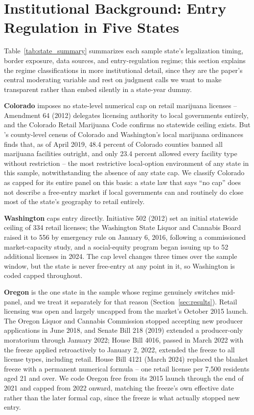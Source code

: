 \documentclass[12pt]{article}
\begin{document}
\section{Institutional Background: Entry Regulation in Five States}
\label{sec:institutional}



Table~\ref{tab:state_summary} summarizes each sample state's legalization timing, border exposure, data
sources, and entry-regulation regime; this section explains the regime classifications in more institutional
detail, since they are the paper's central moderating variable and rest on judgment calls we want to make
transparent rather than embed silently in a state-year dummy.

\textbf{Colorado} imposes no state-level numerical cap on retail marijuana licenses -- Amendment 64 (2012)
delegates licensing authority to local governments entirely, and the Colorado Retail Marijuana Code confirms no
statewide ceiling exists. But \citet{PayanBrownSong2021}'s county-level census of Colorado and Washington's
local marijuana ordinances finds that, as of April 2019, 48.4 percent of Colorado counties banned all marijuana
facilities outright, and only 23.4 percent allowed every facility type without restriction -- the most
restrictive local-option environment of any state in this sample, notwithstanding the absence of any state cap.
We classify Colorado as capped for its entire panel on this basis: a state law that says ``no cap'' does not
describe a free-entry market if local governments can and routinely do close most of the state's geography to
retail entirely.

\textbf{Washington} caps entry directly. Initiative 502 (2012) set an initial statewide ceiling of 334 retail
licenses; the Washington State Liquor and Cannabis Board raised it to 556 by emergency rule on January 6, 2016,
following a commissioned market-capacity study, and a social-equity program began issuing up to 52 additional
licenses in 2024. The cap level changes three times over the sample window, but the state is never free-entry
at any point in it, so Washington is coded capped throughout.

\textbf{Oregon} is the one state in the sample whose regime genuinely switches mid-panel, and we treat it
separately for that reason (Section~\ref{sec:results}). Retail licensing was open and largely uncapped from the
market's October 2015 launch. The Oregon Liquor and Cannabis Commission stopped accepting new producer
applications in June 2018, and Senate Bill 218 (2019) extended a producer-only moratorium through January 2022;
House Bill 4016, passed in March 2022 with the freeze applied retroactively to January 2, 2022, extended the
freeze to all license types, including retail. House Bill 4121 (March 2024) replaced the blanket freeze with a
permanent numerical formula -- one retail license per 7,500 residents aged 21 and over. We code Oregon free
from its 2015 launch through the end of 2021 and capped from 2022 onward, matching the freeze's own effective
date rather than the later formal cap, since the freeze is what actually stopped new entry.
\end{document}
